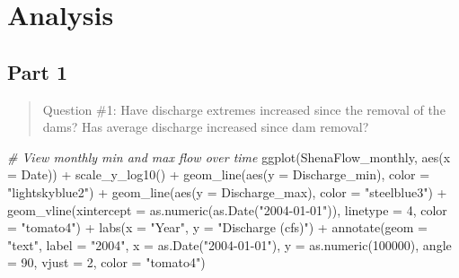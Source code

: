 \documentclass[
  12pt,
]{article}
\newenvironment{Shaded}{\begin{snugshade}}{\end{snugshade}}
\newcommand{\AttributeTok}[1]{\textcolor[rgb]{0.77,0.63,0.00}{#1}}
\newcommand{\CommentTok}[1]{\textcolor[rgb]{0.56,0.35,0.01}{\textit{#1}}}
\newcommand{\DecValTok}[1]{\textcolor[rgb]{0.00,0.00,0.81}{#1}}
\newcommand{\FunctionTok}[1]{\textcolor[rgb]{0.00,0.00,0.00}{#1}}
\newcommand{\NormalTok}[1]{#1}
\newcommand{\SpecialCharTok}[1]{\textcolor[rgb]{0.00,0.00,0.00}{#1}}
\newcommand{\StringTok}[1]{\textcolor[rgb]{0.31,0.60,0.02}{#1}}
\begin{document}
\newpage

\hypertarget{analysis}{%
\section{Analysis}\label{analysis}}

\hypertarget{part-1}{%
\subsection{Part 1}\label{part-1}}

\begin{quote}
Question \#1: Have discharge extremes increased since the removal of the
dams? Has average discharge increased since dam removal?
\end{quote}

\begin{Shaded}
\begin{Highlighting}[]
\CommentTok{\# View monthly min and max flow over time}
\FunctionTok{ggplot}\NormalTok{(ShenaFlow\_monthly, }\FunctionTok{aes}\NormalTok{(}\AttributeTok{x =}\NormalTok{ Date)) }\SpecialCharTok{+}
  \FunctionTok{scale\_y\_log10}\NormalTok{() }\SpecialCharTok{+}
  \FunctionTok{geom\_line}\NormalTok{(}\FunctionTok{aes}\NormalTok{(}\AttributeTok{y =}\NormalTok{ Discharge\_min), }\AttributeTok{color =} \StringTok{"lightskyblue2"}\NormalTok{) }\SpecialCharTok{+}
  \FunctionTok{geom\_line}\NormalTok{(}\FunctionTok{aes}\NormalTok{(}\AttributeTok{y =}\NormalTok{ Discharge\_max), }\AttributeTok{color =} \StringTok{"steelblue3"}\NormalTok{) }\SpecialCharTok{+}
  \FunctionTok{geom\_vline}\NormalTok{(}\AttributeTok{xintercept =} \FunctionTok{as.numeric}\NormalTok{(}\FunctionTok{as.Date}\NormalTok{(}\StringTok{"2004{-}01{-}01"}\NormalTok{)), }
             \AttributeTok{linetype =} \DecValTok{4}\NormalTok{, }\AttributeTok{color =} \StringTok{"tomato4"}\NormalTok{) }\SpecialCharTok{+}
  \FunctionTok{labs}\NormalTok{(}\AttributeTok{x =} \StringTok{"Year"}\NormalTok{, }\AttributeTok{y =} \StringTok{"Discharge (cfs)"}\NormalTok{) }\SpecialCharTok{+}
  \FunctionTok{annotate}\NormalTok{(}\AttributeTok{geom =} \StringTok{"text"}\NormalTok{,}
           \AttributeTok{label =} \StringTok{"2004"}\NormalTok{,}
           \AttributeTok{x =} \FunctionTok{as.Date}\NormalTok{(}\StringTok{"2004{-}01{-}01"}\NormalTok{),}
           \AttributeTok{y =} \FunctionTok{as.numeric}\NormalTok{(}\DecValTok{100000}\NormalTok{),}
           \AttributeTok{angle =} \DecValTok{90}\NormalTok{, }
           \AttributeTok{vjust =} \DecValTok{2}\NormalTok{,}
           \AttributeTok{color =} \StringTok{"tomato4"}\NormalTok{)}
\end{Highlighting}
\end{Shaded}
\end{document}
